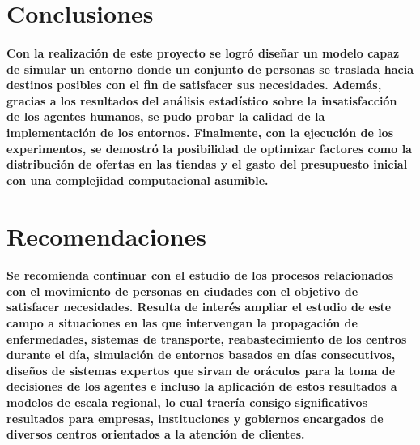 \documentclass[12pt]{amsart}
\begin{document}
\section{Conclusiones}

\paragraph{Con la realización de este proyecto se logró diseñar un modelo capaz de simular un entorno donde un conjunto de personas se traslada hacia destinos posibles con el fin de satisfacer sus necesidades. Además, gracias a los resultados del análisis estadístico sobre la insatisfacción de los agentes humanos, se pudo probar la calidad de la implementación de los entornos. Finalmente, con la ejecución de los experimentos, se demostró la posibilidad de optimizar factores como la distribución de ofertas en las tiendas y el gasto del presupuesto inicial con una complejidad computacional asumible.}

\section{Recomendaciones}

\paragraph{Se recomienda continuar con el estudio de los procesos relacionados con el movimiento de personas en ciudades con el objetivo de satisfacer necesidades. Resulta de interés ampliar el estudio de este campo a situaciones en las que intervengan la propagación de enfermedades, sistemas de transporte, reabastecimiento de los centros durante el día, simulación de entornos basados en días consecutivos, diseños de sistemas expertos que sirvan de oráculos para la toma de decisiones de los agentes e incluso la aplicación de estos resultados a modelos de escala regional, lo cual traería consigo significativos resultados para empresas, instituciones y gobiernos encargados de diversos centros orientados a la atención de clientes.}
\end{document}
